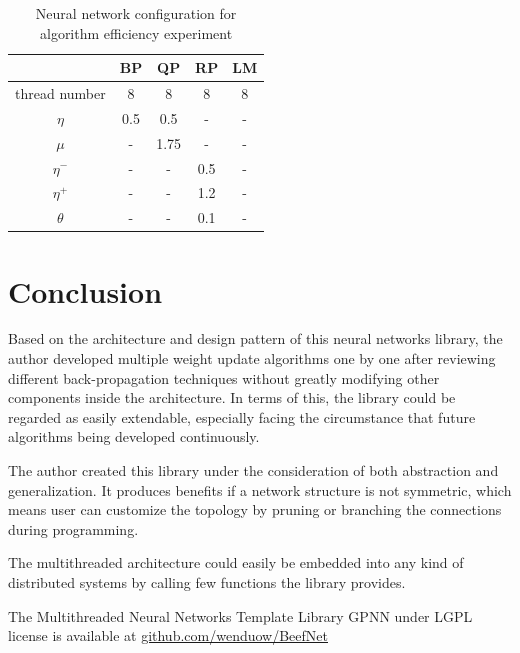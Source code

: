 \documentclass[procedia]{easychair}
\begin{document}
\begin{table}[htp]
    \centering
    \caption{Neural network configuration for algorithm efficiency experiment}
    \begin{tabular}{ c c c c c }
        \hline \hline
        & BP & QP & RP & LM \\
        \hline
        thread number & 8 & 8 & 8 & 8 \\
        $\eta$ & 0.5 & 0.5 & - & - \\
        $\mu$ & - & 1.75 & - & - \\
        $\eta ^ -$ & - & - & 0.5 & - \\
        $\eta ^ +$ & - & - & 1.2 & - \\
        $\theta$ & - & - & 0.1 & - \\
        \hline \hline
    \end{tabular}
    \label{table:config_algorithm_efficiency}
\end{table}


\section{Conclusion}

Based on the architecture and design pattern of this neural networks library, the author developed multiple weight update algorithms one by one after reviewing different back-propagation techniques without greatly modifying other components inside the architecture.  In terms of this, the library could be regarded as easily extendable, especially facing the circumstance that future algorithms being developed continuously.

The author created this library under the consideration of both abstraction and generalization.  It produces benefits if a network structure is not symmetric, which means user can customize the topology by pruning or branching the connections during programming.

The multithreaded architecture could easily be embedded into any kind of distributed systems by calling few functions the library provides.

The Multithreaded Neural Networks Template Library GPNN under LGPL license is available at
\url{github.com/wenduow/BeefNet}

\end{document}
